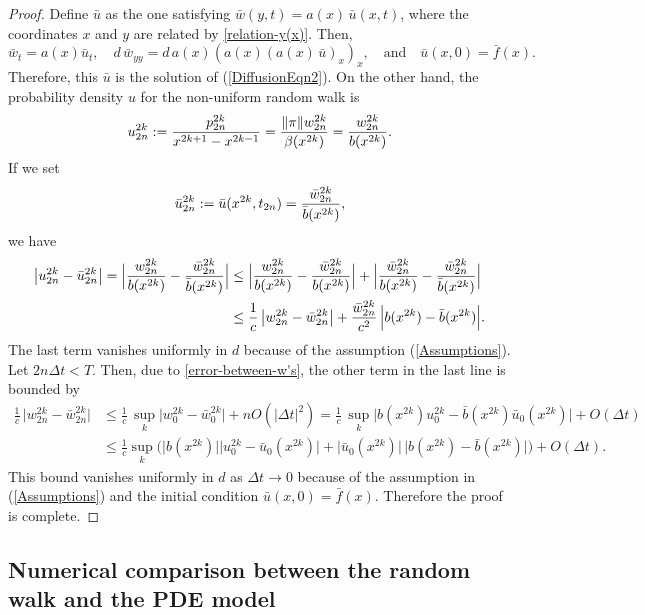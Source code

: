 \documentclass[11pt]{amsart}
\def\d{d}
\begin{document}
\begin{proof}
Define $\bar u$ as the one satisfying $\bar{w}(y,t) =a(x) \,\bar u(x,t)$, where the coordinates $x$ and $y$ are related by \eqref{relation-y(x)}. Then,
$$
\bar w_t=a(x)\bar u_t,\quad \d\,\bar w_{yy}= \d\,a(x)(a(x)(a(x) \,\bar u)_x)_x,\quad\text{and}\quad \bar u(x,0)=\bar f(x) .
$$
Therefore, this $\bar u$ is the solution of (\ref{DiffusionEqn2}). On the other hand, the probability density $u$ for the non-uniform random walk is
\[
u^{2k}_{2n}:={p^{2k}_{2n}\over x^{2k+1}-x^{2k-1}} = {\|\pi\|w_{2n}^{2k}\over\beta(x^{2k})}={w_{2n}^{2k}\over b(x^{2k})}.
\]
If we set
\[\bar u^{2k}_{2n} :=\bar u(x^{2k},t_{2n}) = {\bar{w}^{2k}_{2n}\over\bar b(x^{2k})}, \]
we have
\[
\begin{split}
\big| u^{2k}_{2n}-\bar{u}^{2k}_{2n} \big|=\Big|{w_{2n}^{2k}\over b(x^{2k})}-{\bar{w}^{2k}_{2n}\over\bar b(x^{2k})}\Big| &\le \Big|{w_{2n}^{2k}\over b(x^{2k})}-{\bar{w}^{2k}_{2n}\over b(x^{2k})}
\Big|+\Big|{\bar w_{2n}^{2k}\over b(x^{2k})}-{\bar{w}^{2k}_{2n}\over\bar b(x^{2k})}  \Big|\ \\
&\le \frac{1}{c} \,\big| w^{2k}_{2n} -\bar{w}^{2k}_{2n} \big| + \frac{\bar{w}^{2k}_{2n}}{c^2} \,\Big| b(x^{2k})-\bar b(x^{2k})  \Big|.
\end{split}
\]
The last term vanishes uniformly in $d$ because of the assumption (\ref{Assumptions}). Let $2n\Delta t<T$. Then, due to \eqref{error-between-w's}, the other term in the last line is bounded by
\[\begin{split}
\frac{1}{c} \,\big| w^{2k}_{2n} -\bar{w}^{2k}_{2n} \big| &\le
\frac{1}{c} \, \sup_k \big| w^{2k}_0 -\bar{w}^{2k}_0 \big| +nO(|\Delta t|^2)= \frac{1}{c} \, \sup_k \big| b(x^{2k})u^{2k}_0 -\bar b(x^{2k})\bar{u}_0(x^{2k}) \big| +O(\Delta t)\\
&\le\frac{1}{c}\sup_k\Big(\big|b(x^{2k})\big|\big|u^{2k}_0-\bar{u}_0(x^{2k})\big| +\big|\bar{u}_0(x^{2k})\big|\,\big|b(x^{2k}) -\bar b(x^{2k})\big|\Big)+O(\Delta t).
\end{split}\]
This bound vanishes uniformly in $d$ as $\Delta t \to 0$ because of the assumption in (\ref{Assumptions}) and the initial condition $\bar u(x,0)=\bar f(x)$. Therefore the proof is complete.
\end{proof}


\subsection{Numerical comparison between the random walk and the PDE model}
\end{document}
